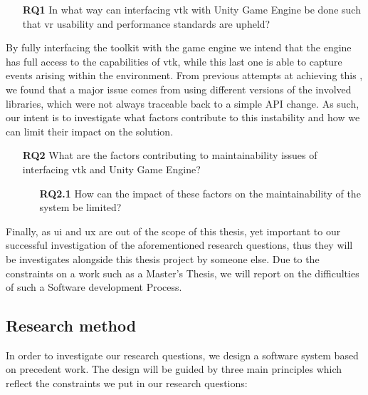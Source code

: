 \begin{itemize}[leftmargin=1.5truecm]
    \item[\textbf{RQ1}] In what way can interfacing \acrlong{vtk} with Unity Game Engine be done such that \acrshort{vr} usability and performance standards are upheld?
\end{itemize}

By fully interfacing the toolkit with the game engine we intend that the engine has full access to the capabilities of \acrshort{vtk}, while this last one is able to capture events arising within the environment. From previous attempts at achieving this \cite{dreuning_visual_2016, kruis_creating_2017, schutte_virtual_2018, wheeler_virtual_2018}, we found that a major issue comes from using different versions of the involved libraries, which were not always traceable back to a simple API change. As such, our intent is to investigate what factors contribute to this instability and how we can limit their impact on the solution.

\begin{itemize}[leftmargin=1.5truecm]
    \item[\textbf{RQ2}] What are the factors contributing to maintainability issues of interfacing \acrlong{vtk} and Unity Game Engine?
    \begin{itemize}[leftmargin=1.5truecm]
        \item[\textbf{RQ2.1}] How can the impact of these factors on the maintainability of the system be limited?
    \end{itemize}
\end{itemize}

Finally, as \acrshort{ui} and \acrshort{ux} are out of the scope of this thesis, yet important to our successful investigation of the aforementioned research questions, thus they will be investigates alongside this thesis project by someone else. Due to the constraints on a work such as a Master's Thesis, we will report on the difficulties of such a Software development Process.

\subsection{Research method}

In order to investigate our research questions, we design a software system based on precedent work. The design will be guided by three main principles which reflect the constraints we put in our research questions:

